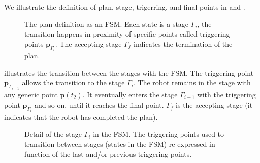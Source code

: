 We illustrate the definition of plan, stage, trigerring, and final points in  and .

\begin{figure}[h]
  \center
  \caption[The plan definition]{The plan definition as an FSM. Each state is a stage $\Gamma_i$, the transition happens in proximity of specific points called triggering points $\mathbf{p}_{\Gamma_i}$. The accepting stage $\Gamma_f$ indicates the termination of the plan.}
  \label{fig:state-machine}
\end{figure}

 illustrates the transition between the stages with the FSM. The triggering point $\mathbf{p}_{\Gamma_{i-1}}$ allows the transition to the stage $\Gamma_i$. The robot remains in the stage with any generic point $\mathbf{p}(t_2)$. It eventually enters the stage $\Gamma_{i+1}$ with the triggering point $\mathbf{p}_{\Gamma_i}$ and so on, until it reaches the final point. $\Gamma_f$ is the accepting stage (it indicates that the robot has completed the plan).

\begin{figure}[h]
  \center
\caption[Detail of a stage in the FSM]{Detail of the stage $\Gamma_i$ in the FSM. The triggering points used to transition between stages (states in the FSM) re expressed in function of the last and/or previous triggering points.}
\label{fig:state-machine2}
\end{figure}
    
